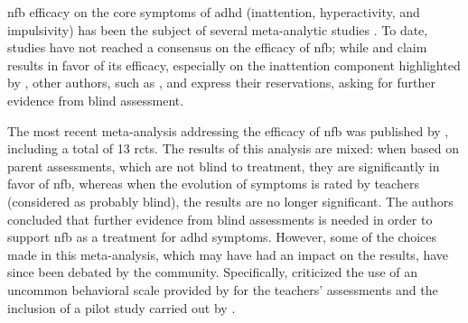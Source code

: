 \Gls{nfb} efficacy on the core symptoms of \gls{adhd} (inattention, hyperactivity, and impulsivity) has been the 
subject of several meta-analytic studies \citep{Loo2005, Lofthouse2012, Arns2009, Micoulaud2014, Sonuga-Barke2013}. 
To date, studies have not reached a consensus on the efficacy of \gls{nfb}; while \citet{Arns2009} and \citet{Micoulaud2014} 
claim results in favor of its efficacy, especially on the inattention component highlighted by \citeauthor{Micoulaud2014}, other authors, such as
\citet{Loo2005, Lofthouse2012}, and \citet{Sonuga-Barke2013} express their reservations, asking for further evidence from blind assessment.

The most recent meta-analysis addressing the efficacy of \gls{nfb} was published by \citet{Cortese2016}, including a total of 13
\glspl{rct}. The results of this analysis are mixed: when based on parent assessments, which are not blind to treatment, they are significantly 
in favor of \gls{nfb}, whereas when the evolution of symptoms is rated by teachers (considered as probably blind), the results are no longer 
significant. The authors concluded that further evidence from blind assessments is needed in order to support \gls{nfb} as a treatment for \gls{adhd} symptoms.
However, some of the choices made in this meta-analysis, which may have had an impact on the results, have since been debated by the community. Specifically, 
\citet{Micoulaud2016} criticized the use of an uncommon behavioral scale provided by \citet{Steiner2014} for the teachers' assessments 
and the inclusion of a pilot study carried out by \citet{Arnold2014}. 

